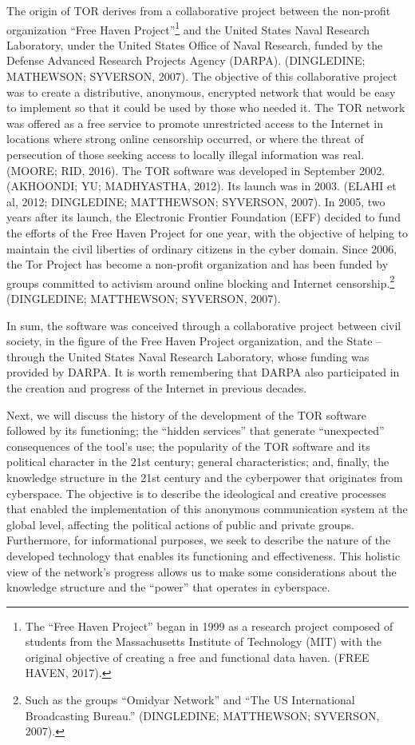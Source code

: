 The origin of TOR derives from a collaborative project between the non-profit organization ``Free Haven Project''\footnote{The ``Free Haven Project'' began in 1999 as a research project composed of students from the Massachusetts Institute of Technology (MIT) with the original objective of creating a free and functional data haven. (FREE HAVEN, 2017).} and the United States Naval Research Laboratory, under the United States Office of Naval Research, funded by the Defense Advanced Research Projects Agency (DARPA). (DINGLEDINE; MATHEWSON; SYVERSON, 2007). The objective of this collaborative project was to create a distributive, anonymous, encrypted network that would be easy to implement so that it could be used by those who needed it. The TOR network was offered as a free service to promote unrestricted access to the Internet in locations where strong online censorship occurred, or where the threat of persecution of those seeking access to locally illegal information was real. (MOORE; RID, 2016). The TOR software was developed in September 2002. (AKHOONDI; YU; MADHYASTHA, 2012). Its launch was in 2003. (ELAHI et al, 2012; DINGLEDINE; MATTHEWSON; SYVERSON, 2007). In 2005, two years after its launch, the Electronic Frontier Foundation (EFF) decided to fund the efforts of the Free Haven Project for one year, with the objective of helping to maintain the civil liberties of ordinary citizens in the cyber domain. Since 2006, the Tor Project has become a non-profit organization and has been funded by groups committed to activism around online blocking and Internet censorship.\footnote{Such as the groups ``Omidyar Network'' and ``The US International Broadcasting Bureau.'' (DINGLEDINE; MATTHEWSON; SYVERSON, 2007).} (DINGLEDINE; MATTHEWSON; SYVERSON, 2007).

In sum, the software was conceived through a collaborative project between civil society, in the figure of the Free Haven Project organization, and the State -- through the United States Naval Research Laboratory, whose funding was provided by DARPA. It is worth remembering that DARPA also participated in the creation and progress of the Internet in previous decades.

Next, we will discuss the history of the development of the TOR software followed by its functioning; the ``hidden services'' that generate ``unexpected'' consequences of the tool's use; the popularity of the TOR software and its political character in the 21st century; general characteristics; and, finally, the knowledge structure in the 21st century and the cyberpower that originates from cyberspace. The objective is to describe the ideological and creative processes that enabled the implementation of this anonymous communication system at the global level, affecting the political actions of public and private groups. Furthermore, for informational purposes, we seek to describe the nature of the developed technology that enables its functioning and effectiveness. This holistic view of the network's progress allows us to make some considerations about the knowledge structure and the ``power'' that operates in cyberspace.


